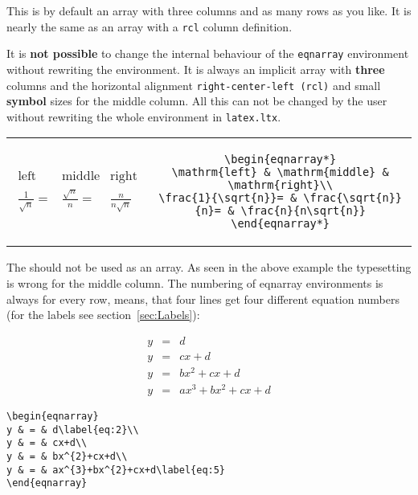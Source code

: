 This is by default an array with three columns and as many rows as
you like.  It is nearly the same as an array with a \verb|rcl|  column definition.

It is \textbf{not possible} to change the internal behaviour of the \verb|eqnarray| environment without
rewriting the environment.
It is always an impli\-cit array with \textbf{three} columns and the horizontal
alignment \verb|right-center-left (rcl)| and small \textbf{symbol} sizes for the
middle column. All this can not be changed by the user without rewriting
the whole environment in \verb|latex.ltx|.

\bigskip\noindent
\begin{tabular}{cc}
\begin{minipage}{0.35\linewidth}
\begin{eqnarray*}
\mathrm{left} & \mathrm{middle} & \mathrm{right}\\
\frac{1}{\sqrt{n}}= & \frac{\sqrt{n}}{n}= & \frac{n}{n\sqrt{n}}
\end{eqnarray*} 
\end{minipage} &
\begin{minipage}{0.63\linewidth}
\begin{lstlisting}
\begin{eqnarray*}
\mathrm{left} & \mathrm{middle} & \mathrm{right}\\
\frac{1}{\sqrt{n}}= & \frac{\sqrt{n}}{n}= & \frac{n}{n\sqrt{n}}
\end{eqnarray*}
\end{lstlisting}
\end{minipage}
\end{tabular}

\bigskip
The  should not be used as an array. As seen in the above
example the typesetting is wrong for the middle column. The numbering of eqnarray
environments is always for every row, means,
that four lines get four different equation numbers (for the labels see 
section~\vref{sec:Labels}):

\bigskip
\begin{minipage}{0.5\columnwidth}
\begin{eqnarray}
y & = & d\label{eq:2}\\
y & = & cx+d\\
y & = & bx^{2}+cx+d\\
y & = & ax^{3}+bx^{2}+cx+d\label{eq:5}
\end{eqnarray}
\end{minipage}\hfill
\begin{minipage}{0.43\columnwidth}
\begin{lstlisting}
\begin{eqnarray}
y & = & d\label{eq:2}\\
y & = & cx+d\\
y & = & bx^{2}+cx+d\\
y & = & ax^{3}+bx^{2}+cx+d\label{eq:5}
\end{eqnarray}
\end{lstlisting}
\end{minipage}


